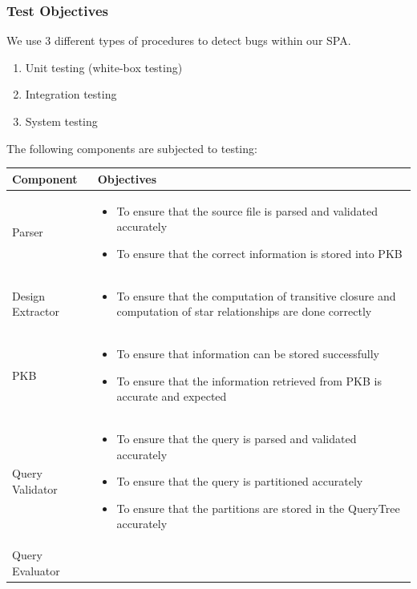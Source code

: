 \documentclass[12pt]{article}
\begin{document}
{{{{{{{{{{{{{\subsubsection{Test Objectives}
We use 3 different types of procedures to detect bugs within our SPA.
\begin{enumerate}
\item Unit testing (white-box testing)
\item Integration testing
\item System testing
\end{enumerate}
\newpage
The following components are subjected to testing: \newline
\small
\begin{tabular}{|L{3cm} | L{13cm}| } 
\hline
\textbf{Component} &
\textbf{Objectives}
 \\
    \hline
    Parser &
\begin{itemize}[noitemsep]
\item To ensure that the source file is parsed and validated accurately
\item To ensure that the correct information is stored into PKB
\end{itemize}  \\\hline
    Design Extractor &
\begin{itemize}[noitemsep]
\item To ensure that the computation of transitive closure and computation of star relationships are done correctly
\end{itemize}  \\\hline
 PKB &
\begin{itemize}[noitemsep]
\item To ensure that information can be stored successfully
\item To ensure that the information retrieved from PKB is accurate and expected
\end{itemize}  \\\hline
 Query Validator &
\begin{itemize}[noitemsep]
\item To ensure that the query is parsed and validated accurately
\item To ensure that the query is partitioned accurately
\item To ensure that the partitions are stored in the QueryTree accurately
\end{itemize}  \\\hline
 Query Evaluator &
\begin{itemize}[noitemsep]

\end{itemize}
\end{tabular}}}}}}}}}}}}}}
\end{document}
